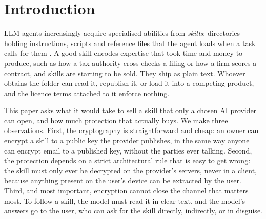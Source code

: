 \section{Introduction}
\label{sec:intro}

LLM agents increasingly acquire specialised abilities from \emph{skills}: directories holding
instructions, scripts and reference files that the agent loads when a task calls for them
\citep{anthropic2025skillsblog,agentskills2026spec}. A good skill encodes expertise that took time
and money to produce, such as how a tax authority cross-checks a filing or how a firm scores a
contract, and skills are starting to be sold. They ship as plain text. Whoever obtains the folder
can read it, republish it, or load it into a competing product, and the licence terms attached to
it enforce nothing.

This paper asks what it would take to sell a skill that only a chosen AI provider can open, and
how much protection that actually buys. We make three observations. First, the cryptography is
straightforward and cheap: an owner can encrypt a skill to a public key the provider publishes, in
the same way anyone can encrypt email to a published key, without the parties ever talking.
Second, the protection depends on a strict architectural rule that is easy to get wrong: the skill
must only ever be decrypted on the provider's servers, never in a client, because anything present
on the user's device can be extracted by the user. Third, and most important, encryption cannot
close the channel that matters most. To follow a skill, the model must read it in clear text, and
the model's answers go to the user, who can ask for the skill directly, indirectly, or in
disguise.

